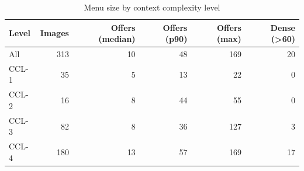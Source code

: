 \begin{table}[t]
\centering
\caption{Menu size by context complexity level}
\label{tab:density}
\small
\begin{tabular}{lrrrrr}
\toprule
Level & Images & Offers (median) & Offers (p90) & Offers (max) & Dense (>60) \\
\midrule
All & 313 & 10 & 48 & 169 & 20 \\
CCL-1 & 35 & 5 & 13 & 22 & 0 \\
CCL-2 & 16 & 8 & 44 & 55 & 0 \\
CCL-3 & 82 & 8 & 36 & 127 & 3 \\
CCL-4 & 180 & 13 & 57 & 169 & 17 \\
\bottomrule
\end{tabular}
\end{table}
